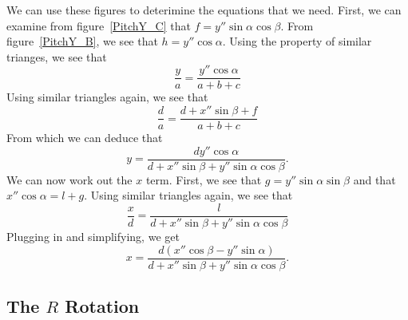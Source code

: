 \begin{SCfigure}[1][htb]
\centering
 
\label{PitchY_A}
\caption{.}
\end{SCfigure}

\begin{SCfigure}[1][htb]
\centering
 
\label{PitchY_B}
\caption{.}
\end{SCfigure}

\begin{SCfigure}[1][htb]
\centering
 
\label{PitchY_C}
\caption{.}
\end{SCfigure}

We can use these figures to deterimine the equations 
that we need. First, we can examine from figure~\ref{PitchY_C} 
that $f=y''\sin\alpha\cos\beta$. From figure~\ref{PitchY_B},
we see that $h=y''\cos\alpha$. Using the property of similar
trianges, we see that
\begin{equation}
    \frac{y}{a} = \frac{y''\cos\alpha}{a+b+c}
\end{equation}
Using similar triangles again, we see that
\begin{equation}
    \frac{d}{a} = \frac{d+x''\sin\beta+f}{a+b+c}
\end{equation}
From which we can deduce that
\begin{equation}\label{ytermsydoubleprime}
    \boxed{y=\frac{dy''\cos\alpha}{
    d+x''\sin\beta+y''\sin\alpha\cos\beta}.}
\end{equation}
We can now work out the $x$ term. First, we see that
$g=y''\sin\alpha\sin\beta$ and that 
$x''\cos\alpha=l+g$. Using similar triangles again, 
we see that 
\begin{equation}\label{xtermsxdoubleprime}
    \frac{x}{d} = \frac{l}{d+x''\sin\beta+
    y''\sin\alpha\cos\beta}
\end{equation}
Plugging in and simplifying, we get
\begin{equation}
    \boxed{x=\frac{d(x''\cos\beta-y''\sin\alpha)}{
    d+x''\sin\beta+y''\sin\alpha\cos\beta}.}
\end{equation}


\subsection{The $R$ Rotation}

\begin{SCfigure}[1][htb]
\centering

\caption{This figure shows how points on a detector rotated 
by angle $R$ relate to the unrotated points. Remember that
a rotation of the plane is equivalent to the rotation of the
coordinates on the plane (which is what I have drawn).}
\label{RotationFormula}
\end{SCfigure}

